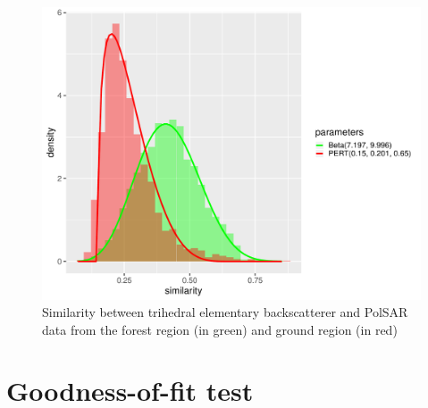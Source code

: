 \documentclass[conference]{IEEEtran}
\begin{document}
\begin{figure}[!ht]
    \centering
    \includegraphics[width = .9\linewidth, height = .7\linewidth]{../../../Figures/paper_19_05/tr.pdf}
    \caption{Similarity between trihedral elementary backscatterer and PolSAR data from the forest region (in green) and ground region (in red)}
    \label{fig:tr}
\end{figure}

\section{Goodness-of-fit test}
\end{document}
